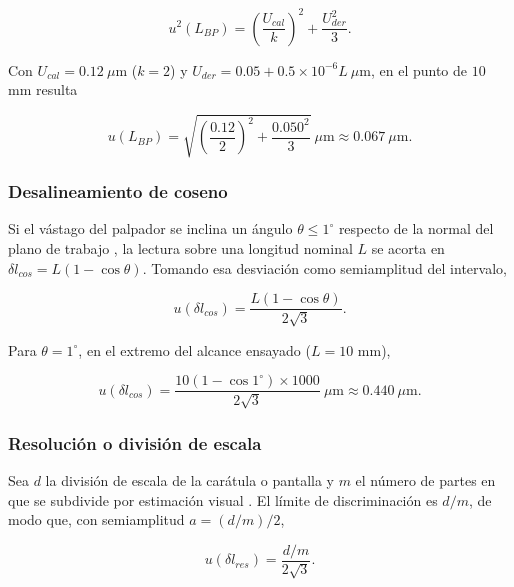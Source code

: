 \begin{equation}
  u^2(L_{BP}) = \left(\frac{U_{cal}}{k}\right)^2 + \frac{U_{der}^2}{3}.
  \label{eq:reloj-sigma-LBP}
\end{equation}

Con $U_{cal} = 0.12\ \mu\text{m}$ ($k = 2$) y
$U_{der} = 0.05 + 0.5\times10^{-6}L\ \mu\text{m}$, en el punto de $10$ mm resulta

\begin{equation}
  u(L_{BP}) = \sqrt{\left(\frac{0.12}{2}\right)^2 + \frac{0.050^2}{3}}\ \mu\text{m}
  \approx 0.067\ \mu\text{m}.
  \label{eq:reloj-sigma-LBP-valor}
\end{equation}

\subsubsection*{Desalineamiento de coseno}

Si el vástago del palpador se inclina un ángulo $\theta \le 1^\circ$ respecto de la
normal del plano de trabajo \parencite{axiospec_dial, cem_di010}, la lectura sobre una
longitud nominal $L$ se acorta en $\delta l_{cos} = L(1 - \cos\theta)$. Tomando esa
desviación como semiamplitud del intervalo,

\begin{equation}
  u(\delta l_{cos}) = \frac{L(1 - \cos\theta)}{2\sqrt{3}}.
  \label{eq:reloj-sigma-cos}
\end{equation}

Para $\theta = 1^\circ$, en el extremo del alcance ensayado ($L = 10$ mm),

\begin{equation}
  u(\delta l_{cos}) =
  \frac{10(1-\cos 1^\circ)\times1000}{2\sqrt{3}}\ \mu\text{m}
  \approx 0.440\ \mu\text{m}.
  \label{eq:reloj-sigma-cos-valor}
\end{equation}

\subsubsection*{Resolución o división de escala}

Sea $d$ la división de escala de la carátula o pantalla y $m$ el número de partes en
que se subdivide por estimación visual \parencite{jcgm2008gum, axiospec_dial}. El
límite de discriminación es $d/m$, de modo que, con semiamplitud $a = (d/m)/2$,

\begin{equation}
  u(\delta l_{res}) = \frac{d/m}{2\sqrt{3}}.
  \label{eq:reloj-sigma-res}
\end{equation}

